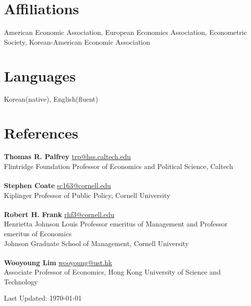 \documentclass[margin, a4paper]{res}
\begin{document}
\begin{resume}
\section{Affiliations} American Economic Association, European Economics Association, Econometric Society, Korean-American Economic Association

\section{Languages} Korean(native), English(fluent)

\section{References} \textbf{Thomas R. Palfrey} \href{mailto:trp@hss.caltech.edu}{trp@hss.caltech.edu}\\
Flintridge Foundation Professor of Economics and Political Science, Caltech\\\\
\textbf{Stephen Coate} \href{mailto:sc163@cornell.edu}{sc163@cornell.edu}\\
Kiplinger Professor of Public Policy, Cornell University\\\\
\textbf{Robert H. Frank} \href{mailto:rhf3@cornell.edu}{rhf3@cornell.edu}\\
Henrietta Johnson Louis Professor emeritus of Management and Professor emeritus of Economics\\
Johnson Graduate School of Management, Cornell University\\\\
\textbf{Wooyoung Lim} \href{mailto:wooyoung@ust.hk}{wooyoung@ust.hk}\\
Associate Professor of Economics, Hong Kong University of Science and Technology
\begin{flushright}
Last Updated: \today
\end{flushright}
\end{resume} 
\end{document}
